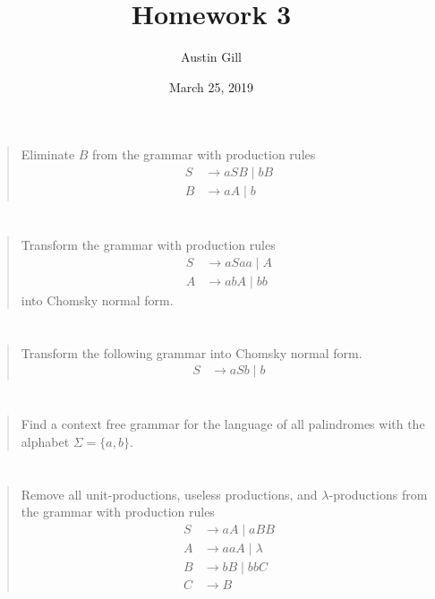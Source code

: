 \documentclass{article}
\title{Homework 3}
\author{Austin Gill}
\date{March 25, 2019}
\begin{document}
\maketitle

\section{}
\begin{quote}
    Eliminate $B$ from the grammar with production rules
    \begin{align*}
        S & \to aSB \mid bB \\
        B & \to aA \mid b
    \end{align*}
\end{quote}

\section{}
\begin{quote}
    Transform the grammar with production rules
    \begin{align*}
        S & \to aSaa \mid A \\
        A & \to abA \mid bb
    \end{align*}
    into Chomsky normal form.
\end{quote}

\section{}
\begin{quote}
    Transform the following grammar into Chomsky normal form.
    \begin{align*}
        S & \to aSb \mid b
    \end{align*}
\end{quote}

\section{}
\begin{quote}
    Find a context free grammar for the language of all palindromes with the alphabet $\Sigma = \{a, b\}$.
\end{quote}

\section{}
\begin{quote}
    Remove all unit-productions, useless productions, and $\lambda$-productions from the grammar with production rules
    \begin{align*}
        S & \to aA \mid aBB      \\
        A & \to aaA \mid \lambda \\
        B & \to bB \mid bbC      \\
        C & \to B
    \end{align*}
\end{quote}
\end{document}
